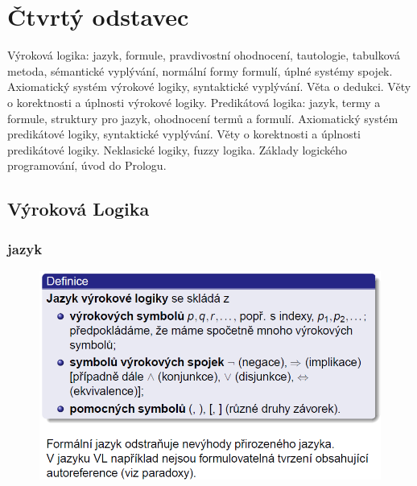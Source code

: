 \documentclass[10pt,a4paper]{article}
\theoremstyle{note}
\begin{document}

\section{Čtvrtý odstavec}

Výroková logika: jazyk, formule, pravdivostní ohodnocení, tautologie, tabulková metoda, sémantické vyplývání,
normální formy formulí, úplné systémy spojek. Axiomatický systém výrokové logiky, syntaktické vyplývání. Věta
o dedukci. Věty o korektnosti a úplnosti výrokové logiky. Predikátová logika: jazyk, termy a formule, struktury
pro jazyk, ohodnocení termů a formulí. Axiomatický systém predikátové logiky, syntaktické vyplývání. Věty o
korektnosti a úplnosti predikátové logiky. Neklasické logiky, fuzzy logika. Základy logického programování, úvod
do Prologu.


	\subsection{Výroková Logika}

		\subsubsection{jazyk}
			\begin{figure}[!h]
			\centering
			\includegraphics[width=13cm]{img/jazykVL.png}
			\end{figure}
\end{document}
